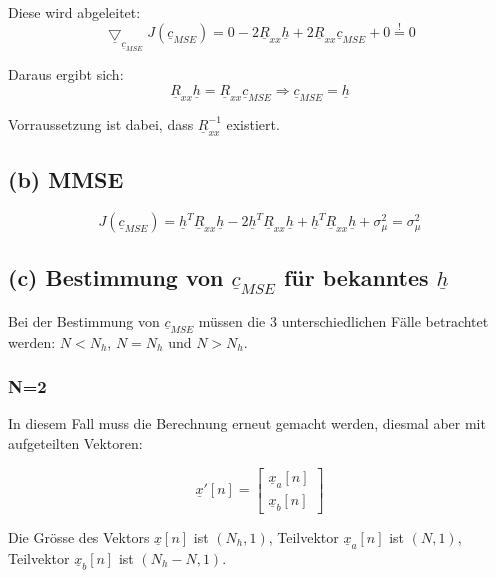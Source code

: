 Diese wird abgeleitet:
\begin{equation}
 \underline{\bigtriangledown}_{\underline{c}_{MSE}} J(\underline{c}_{MSE}) = 0 - 2 \underline{R}_{xx} \underline{h} + 2 \underline{R}_{xx} \underline{c}_{MSE} + 0 \stackrel{!}{=} 0
\end{equation}

Daraus ergibt sich:
\begin{equation}
 \underline{R}_{xx} \underline{h} = \underline{R}_{xx} \underline{c}_{MSE} \Rightarrow \underline{c}_{MSE} = \underline{h}
\end{equation}

Vorraussetzung ist dabei, dass $\underline{R}_{xx}^{-1}$ existiert.

\subsection{(b) MMSE}

\begin{equation}
 J(\underline{c}_{MSE}) = \underline{h}^T \underline{R}_{xx} \underline{h} - 2 \underline{h}^T \underline{R}_{xx} \underline{h} + \underline{h}^T \underline{R}_{xx} \underline{h} + \sigma_\mu^2 = \sigma_\mu^2
\end{equation}


\subsection{(c) Bestimmung von $\underline{c}_{MSE}$ für bekanntes $\underline{h}$}

Bei der Bestimmung von $\underline{c}_{MSE}$ müssen die 3 unterschiedlichen Fälle betrachtet werden: $N<N_h$, $N=N_h$ und $N>N_h$.


\subsubsection{N=2}

In diesem Fall muss die Berechnung erneut gemacht werden, diesmal aber mit aufgeteilten Vektoren:

$$ \underline{x}'[n] = \begin{bmatrix} \underline{x}_a[n] \\ \underline{x}_b[n] \end{bmatrix} $$

Die Grösse des Vektors $\underline{x}[n]$ ist $(N_h,1)$, Teilvektor $\underline{x}_a[n]$ ist $(N,1)$, Teilvektor $\underline{x}_b[n]$ ist $(N_h-N,1)$.

